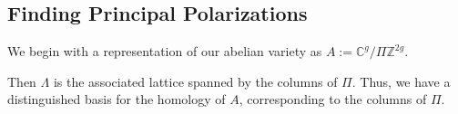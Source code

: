 \documentclass[12pt,reqno]{amsart}
\DeclareMathOperator{\Jac}{Jac}
\newcommand{\C}{\mathbb{C}}
\newcommand{\Z}{\mathbb{Z}}
\newcommand{\mc}{\mathcal}
\theoremstyle{definition}
\newtheorem{defn}{Definition}
\theoremstyle{remark}
\newtheorem*{remark}{Remark}
\begin{document}

\subsection{Finding Principal Polarizations} 
\label{sec:find}
We begin with a representation of our abelian variety as $A := \C^g/\Pi\Z^{2g}$. 

Then $\Lambda$ is the associated lattice spanned by the columns of $\Pi$. Thus, we have a distinguished basis for the homology of $A$, corresponding to the columns of $\Pi$. 
\end{document}
